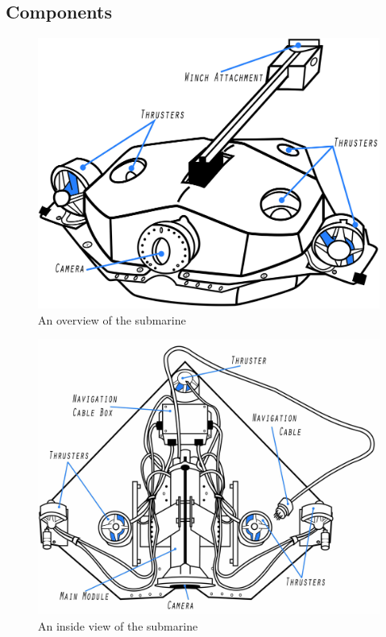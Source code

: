 \documentclass[
18pt, %
a4paper, %
oneside, %
headinclude,footinclude, %
]{scrartcl}
\begin{document}
\subsection{Components}
\vspace*{5mm}
\begin{figure}[H]
	\centering 
	\hspace*{-2.5cm}
	\includegraphics[width=1.4\linewidth]{Figures/Component_Diagrams/basic_sub.jpg}
	\caption[]{An overview of the submarine} %
\end{figure}
\vspace*{5mm}
\begin{figure}[H]
	\centering 
	\hspace*{-2.5cm}
	\includegraphics[width=1.4\columnwidth]{Figures/Component_Diagrams/inside_sub.jpg}
	\caption[]{An inside view of the submarine} %
\end{figure}
\end{document}

